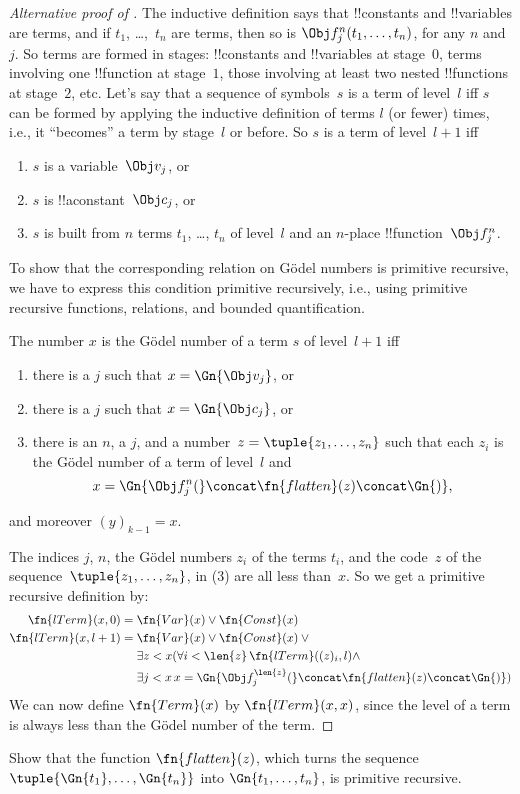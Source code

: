 \documentclass[../../../include/open-logic-section]{subfiles}
\begin{document}
\begin{proof}[Alternative proof of ]
The inductive definition says that !!{constant}s and !!{variable}s are
terms, and if $t_1$, \dots,~$t_n$ are terms, then so is $\Obj
f^n_j(t_1, \dots, t_n)$, for any $n$ and $j$. So terms are formed in
stages: !!{constant}s and !!{variable}s at stage~$0$, terms involving
one !!{function} at stage~$1$, those involving at least two nested
!!{function}s at stage~$2$, etc.  Let's say that a sequence of
symbols~$s$ is a term of level~$l$ iff $s$ can be formed by applying
the inductive definition of terms $l$ (or fewer) times, i.e., it
``becomes'' a term by stage~$l$ or before.  So $s$ is a term of
level~$l+1$ iff
\begin{enumerate}
\item $s$ is a variable~$\Obj v_j$, or
\item $s$ is !!a{constant}~$\Obj c_j$, or
\item $s$ is built from $n$ terms $t_1$, \dots, $t_n$ of level~$l$
  and an $n$-place !!{function}~$\Obj f^n_j$.
\end{enumerate}
To show that the corresponding relation on G\"odel numbers is
primitive recursive, we have to express this condition primitive
recursively, i.e., using primitive recursive functions, relations, and
bounded quantification.

The number $x$ is the G\"odel number of a term $s$ of level~$l+1$ iff
\begin{enumerate}
\item there is a $j$ such that $x = \Gn{\Obj v_j}$, or
\item there is a $j$ such that $x = \Gn{\Obj c_j}$, or
\item there is an $n$, a $j$, and a number~$z = \tuple{z_1, \dots, z_n}$ such
  that each $z_i$ is the G\"odel number of a term of level~$l$ and
\[
x = \Gn{\Obj f^n_j(} \concat \fn{flatten}(z) \concat \Gn{)},
\]
\end{enumerate}
and moreover $(y)_{k-1} = x$.

The indices $j$, $n$, the G\"odel numbers $z_i$ of the terms $t_i$,
and the code~$z$ of the sequence~$\tuple{z_1, \dots, z_n}$, in (3) are
all less than~$x$. So we get a primitive recursive definition by:
\begin{align*}
\fn{lTerm}(x, 0) = {}& \fn{Var}(x) \lor \fn{Const}(x)\\
\fn{lTerm}(x, l+1) = {}&\fn{Var}(x) \lor \fn{Const}(x) \lor {}\\
& \exists z<x(\forall i<\len{z}\, \fn{lTerm}((z)_i, l) \land \\
& \exists j<x \,x = \Gn{\Obj f^{\len{z}}_j(} \concat
\fn{flatten}(z) \concat \Gn{)})
\end{align*}
We can now define $\fn{Term}(x)$ by $\fn{lTerm}(x, x)$, since the level
of a term is always less than the G\"odel number of the term.
\end{proof}

\begin{prob}
Show that the function $\fn{flatten}(z)$, which turns the sequence
$\tuple{\Gn{t_1}, \dots, \Gn{t_n}}$ into $\Gn{t_1, \dots, t_n}$, is
primitive recursive.
\end{prob}
\end{document}
